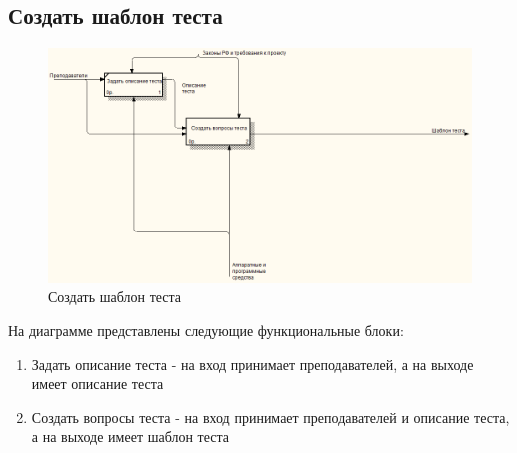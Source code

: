     \subsection{Создать шаблон теста}
    \begin{figure}[H]
        \includegraphics[width=\textwidth, center]{../img/idef0/CreateTestTemplate.png}
        \caption{Создать шаблон теста}
    \end{figure}

    На диаграмме представлены следующие функциональные блоки:
    \begin{enumerate}
        \item Задать описание теста - на вход принимает преподавателей, а на выходе
        имеет описание теста
        \item Создать вопросы теста - на вход принимает преподавателей и описание теста,
        а на выходе имеет шаблон теста
    \end{enumerate}


